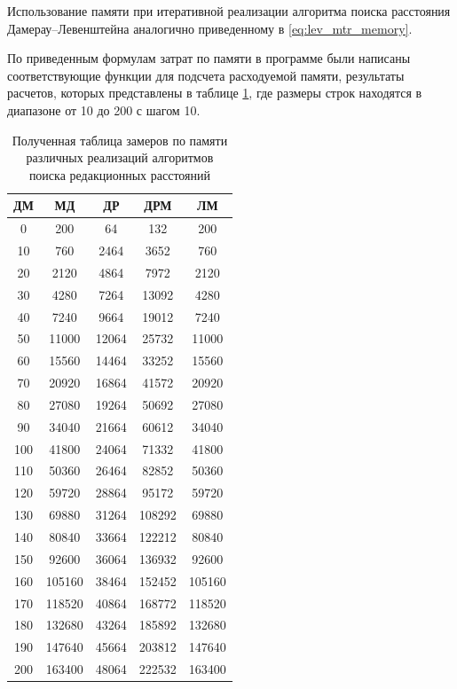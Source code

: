 Использование памяти при итеративной реализации алгоритма поиска расстояния Дамерау--Левенштейна аналогично приведенному
в \ref{eq:lev_mtr_memory}.

По приведенным формулам затрат по памяти в программе были написаны соответствующие функции для подсчета расходуемой памяти, результаты расчетов, которых представлены в таблице \ref{t:memory}, где размеры строк находятся в диапазоне от 10 до 200 с шагом 10.

\clearpage

\begin{table}[!ht]
    \centering
    \caption{Полученная таблица замеров по памяти различных реализаций алгоритмов поиска редакционных расстояний}
    \label{t:memory}
    \begin{tabular}{|c|c|c|c|c|}
    \hline
        ДМ & МД & ДР & ДРМ & ЛМ \\ \hline
        0 & 200 & 64 & 132 & 200 \\ \hline
        10 & 760 & 2464 & 3652 & 760 \\ \hline
        20 & 2120 & 4864 & 7972 & 2120 \\ \hline
        30 & 4280 & 7264 & 13092 & 4280 \\ \hline
        40 & 7240 & 9664 & 19012 & 7240 \\ \hline
        50 & 11000 & 12064 & 25732 & 11000 \\ \hline
        60 & 15560 & 14464 & 33252 & 15560 \\ \hline
        70 & 20920 & 16864 & 41572 & 20920 \\ \hline
        80 & 27080 & 19264 & 50692 & 27080 \\ \hline
        90 & 34040 & 21664 & 60612 & 34040 \\ \hline
        100 & 41800 & 24064 & 71332 & 41800 \\ \hline
        110 & 50360 & 26464 & 82852 & 50360 \\ \hline
        120 & 59720 & 28864 & 95172 & 59720 \\ \hline
        130 & 69880 & 31264 & 108292 & 69880 \\ \hline
        140 & 80840 & 33664 & 122212 & 80840 \\ \hline
        150 & 92600 & 36064 & 136932 & 92600 \\ \hline
        160 & 105160 & 38464 & 152452 & 105160 \\ \hline
        170 & 118520 & 40864 & 168772 & 118520 \\ \hline
        180 & 132680 & 43264 & 185892 & 132680 \\ \hline
        190 & 147640 & 45664 & 203812 & 147640 \\ \hline
        200 & 163400 & 48064 & 222532 & 163400 \\ \hline
    \end{tabular}
\end{table}

